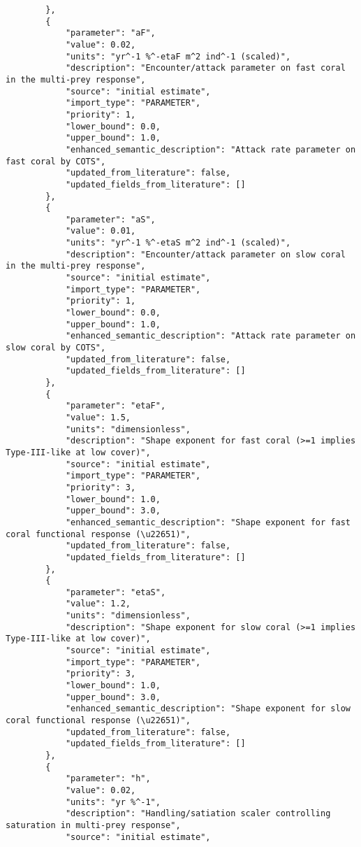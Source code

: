 \begin{lstlisting}
        },
        {
            "parameter": "aF",
            "value": 0.02,
            "units": "yr^-1 %^-etaF m^2 ind^-1 (scaled)",
            "description": "Encounter/attack parameter on fast coral in the multi-prey response",
            "source": "initial estimate",
            "import_type": "PARAMETER",
            "priority": 1,
            "lower_bound": 0.0,
            "upper_bound": 1.0,
            "enhanced_semantic_description": "Attack rate parameter on fast coral by COTS",
            "updated_from_literature": false,
            "updated_fields_from_literature": []
        },
        {
            "parameter": "aS",
            "value": 0.01,
            "units": "yr^-1 %^-etaS m^2 ind^-1 (scaled)",
            "description": "Encounter/attack parameter on slow coral in the multi-prey response",
            "source": "initial estimate",
            "import_type": "PARAMETER",
            "priority": 1,
            "lower_bound": 0.0,
            "upper_bound": 1.0,
            "enhanced_semantic_description": "Attack rate parameter on slow coral by COTS",
            "updated_from_literature": false,
            "updated_fields_from_literature": []
        },
        {
            "parameter": "etaF",
            "value": 1.5,
            "units": "dimensionless",
            "description": "Shape exponent for fast coral (>=1 implies Type-III-like at low cover)",
            "source": "initial estimate",
            "import_type": "PARAMETER",
            "priority": 3,
            "lower_bound": 1.0,
            "upper_bound": 3.0,
            "enhanced_semantic_description": "Shape exponent for fast coral functional response (\u22651)",
            "updated_from_literature": false,
            "updated_fields_from_literature": []
        },
        {
            "parameter": "etaS",
            "value": 1.2,
            "units": "dimensionless",
            "description": "Shape exponent for slow coral (>=1 implies Type-III-like at low cover)",
            "source": "initial estimate",
            "import_type": "PARAMETER",
            "priority": 3,
            "lower_bound": 1.0,
            "upper_bound": 3.0,
            "enhanced_semantic_description": "Shape exponent for slow coral functional response (\u22651)",
            "updated_from_literature": false,
            "updated_fields_from_literature": []
        },
        {
            "parameter": "h",
            "value": 0.02,
            "units": "yr %^-1",
            "description": "Handling/satiation scaler controlling saturation in multi-prey response",
            "source": "initial estimate",

\end{lstlisting}

